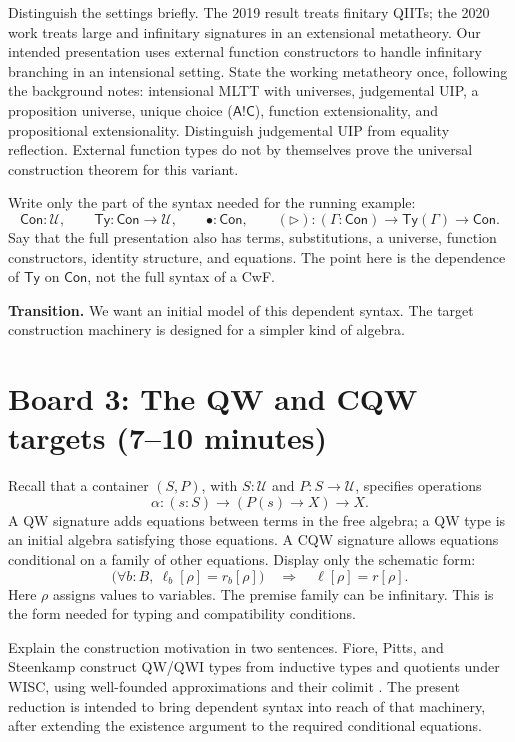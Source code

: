 \documentclass[11pt]{article}
\newcommand{\Con}{\mathsf{Con}}
\newcommand{\Ty}{\mathsf{Ty}}
\newcommand{\ext}{\mathbin{\triangleright}}
\begin{document}
Distinguish the settings briefly. The 2019 result treats finitary QIITs; the
2020 work treats large and infinitary signatures in an extensional
metatheory. Our intended presentation uses external function constructors
to handle infinitary branching in an intensional setting. State the working
metatheory once, following the background notes: intensional MLTT with
universes, judgemental UIP, a proposition universe, unique choice
(\(\mathsf{A!C}\)), function extensionality, and propositional
extensionality. Distinguish judgemental UIP from equality reflection.
External function types do not by themselves prove the universal
construction theorem for this variant.

Write only the part of the syntax needed for the running example:
\[
 \Con:\mathcal U,\qquad
 \Ty:\Con\to\mathcal U,\qquad
 \bullet:\Con,\qquad
 ({\ext}):(\Gamma:\Con)\to\Ty(\Gamma)\to\Con.
\]
Say that the full presentation also has terms, substitutions, a universe,
function constructors, identity structure, and equations. The point here is
the dependence of \(\Ty\) on \(\Con\), not the full syntax of a CwF.

\textbf{Transition.} We want an initial model of this dependent syntax.
The target construction machinery is designed for a simpler kind of algebra.

\section*{Board 3: The QW and CQW targets (7--10 minutes)}

Recall that a container \((S,P)\), with \(S:\mathcal U\) and
\(P:S\to\mathcal U\), specifies operations
\[
 \alpha:(s:S)\to(P(s)\to X)\to X.
\]
A QW signature adds equations between terms in the free algebra; a QW type
is an initial algebra satisfying those equations. A CQW signature allows
equations conditional on a family of other equations. Display only the
schematic form:
\[
 \bigl(\forall b:B,\ \ell_b[\rho]=r_b[\rho]\bigr)
 \quad\Longrightarrow\quad \ell[\rho]=r[\rho].
\]
Here \(\rho\) assigns values to variables. The premise family can be
infinitary. This is the form needed for typing and compatibility conditions.

Explain the construction motivation in two sentences. Fiore, Pitts, and
Steenkamp construct QW/QWI types from inductive types and quotients under
WISC, using well-founded approximations and their colimit \cite{FPS22}.
The present reduction is intended to bring dependent syntax into reach of
that machinery, after extending the existence argument to the required
conditional equations.
\end{document}
